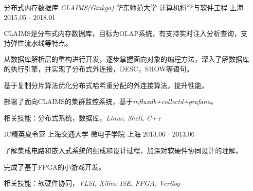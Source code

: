 \begin{cventries}
  \cventry
    {分布式内存数据库  \it{CLAIMS(Ginkgo)}  } 
    {华东师范大学 \quad 计算机科学与软件工程}
    {上海}
    {2015.05 - 2018.01}
    {
      \begin{cvitems}
	\item {CLAIMS是分布式内存数据库，目标为OLAP系统，有支持实时注入分析查询，支持弹性流水线等特点。}
	\item {从数据库解析层的重构进行开发，逐步掌握面向对象的编程方法，深入了解数据库的执行引擎，并实现了分布式外连接，DESC，SHOW等语句。}
	\item {基于复制分片算法优化分布式哈希重分配的外连接算法，提升性能。}
	\item {部署了面向CLAIMS的集群监控系统，基于\it{influxdb+collectd+grafana}。}
	\item {相关技能：分布式系统，数据库，\it{Linux, Shell, C++}}
	\item {\it\color{red}{https://github.com/FishYoung/CLAIMS/tree/for\_auto\_test}}
      \end{cvitems}
    }
  \cventry
    {IC精英夏令营}
    {上海交通大学 \quad 微电子学院}
    {上海}
    {2013.06 - 2013.06}
    {
      \begin{cvitems}
        \item {了解集成电路和嵌入式系统的组成和设计过程，加深对软硬件协同设计的理解。}
        \item {完成了基于FPGA的小游戏开发。}
        \item {相关技能：软硬件协同，\it{VLSI, Xilinx ISE, FPGA, Verilog}}
      \end{cvitems}
    }
\end{cventries}
